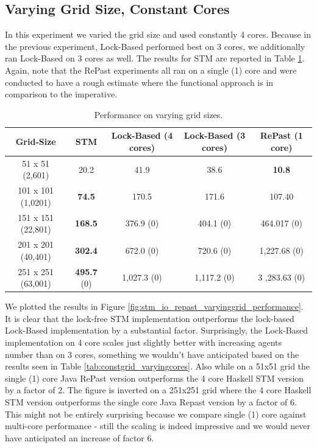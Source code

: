 \subsection{Varying Grid Size, Constant Cores}
In this experiment we varied the grid size and used constantly 4 cores. Because in the previous experiment, Lock-Based performed best on 3 cores, we additionally ran Lock-Based on 3 cores as well. The results for STM are reported in Table \ref{tab:varyinggrid_constcores}. Again, note that the RePast experiments all ran on a single (1) core and were conducted to have a rough estimate where the functional approach is in comparison to the imperative.

\begin{table}
	\centering
  	\begin{tabular}{ c || c | c | c | c }
        Grid-Size          & STM              & Lock-Based (4 cores) & Lock-Based (3 cores) & RePast (1 core) \\ \hline \hline 
   		51 x 51 (2,601)    & 20.2             & 41.9                 & 38.6                 & \textbf{10.8}\\ \hline
   		101 x 101 (1,0201) & \textbf{74.5}    & 170.5                & 171.6                & 107.40 \\ \hline
   		151 x 151 (22,801) & \textbf{168.5}   & 376.9 (0)              & 404.1 (0)              & 464.017  (0) \\ \hline
   		201 x 201 (40,401) & \textbf{302.4}   & 672.0 (0)              & 720.6 (0)              & 1,227.68 (0)  \\ \hline
   		251 x 251 (63,001) & \textbf{495.7} (0) & 1,027.3 (0)            & 1,117.2 (0)            &3 ,283.63 (0)
  	\end{tabular}

  	\caption{Performance on varying grid sizes.}
	\label{tab:varyinggrid_constcores}
\end{table}

We plotted the results in Figure \ref{fig:stm_io_repast_varyinggrid_performance}. It is clear that the lock-free STM implementation outperforms the lock-based Lock-Based implementation by a substantial factor. Surprisingly, the Lock-Based implementation on 4 core scales just slightly better with increasing agents number than on 3 cores, something we wouldn't have anticipated based on the results seen in Table \ref{tab:constgrid_varyingcores}. Also  while on a 51x51 grid the single (1) core Java RePast version outperforms the 4 core Haskell STM version by a factor of 2. The figure is inverted on a 251x251 grid where the 4 core Haskell STM version outperforms the single core Java Repast version by a factor of 6. This might not be entirely surprising because we compare single (1) core against multi-core performance - still the scaling is indeed impressive and we would never have anticipated an increase of factor 6.

